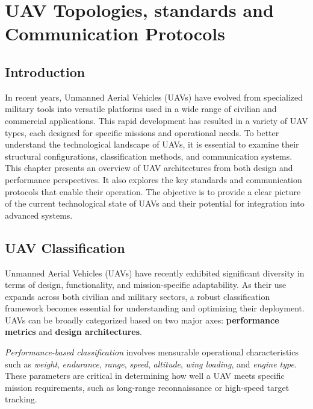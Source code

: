 
\chapter{UAV Topologies, standards and Communication Protocols}
\section{Introduction}



In recent years, Unmanned Aerial Vehicles (UAVs) have evolved from specialized military tools into versatile platforms used in a wide range of civilian and commercial applications. This rapid development has resulted in a variety of UAV types, each designed for specific missions and operational needs. To better understand the technological landscape of UAVs, it is essential to examine their structural configurations, classification methods, and communication systems. This chapter presents an overview of UAV architectures from both design and performance perspectives. It also explores the key standards and communication protocols that enable their operation. The objective is to provide a clear picture of the current technological state of UAVs and their potential for integration into advanced systems.


\section{UAV Classification}




Unmanned Aerial Vehicles (UAVs) have recently exhibited significant diversity in terms of design, functionality, and mission-specific adaptability. As their use expands across both civilian and military sectors, a robust classification framework becomes essential for understanding and optimizing their deployment. UAVs can be broadly categorized based on two major axes: \textbf{performance metrics} and \textbf{design architectures}.

\vspace{0.5cm}

\textit{Performance-based classification} involves measurable operational characteristics such as \textit{weight}, \textit{endurance}, \textit{range}, \textit{speed}, \textit{altitude}, \textit{wing loading}, and \textit{engine type}. These parameters are critical in determining how well a UAV meets specific mission requirements, such as long-range reconnaissance or high-speed target tracking.

